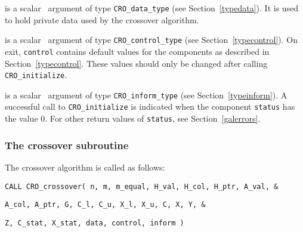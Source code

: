 \documentclass{galahad}
\newcommand{\packagename}{CRO}
\begin{document}
\vspace*{-3mm}
\begin{description}

 is a scalar \intentinout\ argument of type
{\tt \packagename\_data\_type}
(see Section~\ref{typedata}).
It is used to hold private data used by the crossover algorithm.

 is a scalar \intentout\ argument of type
{\tt \packagename\_control\_type}
(see Section~\ref{typecontrol}).
On exit, {\tt control} contains default values for the components as
described in Section~\ref{typecontrol}.
These values should only be changed after calling
{\tt \packagename\_initialize}.

 is a scalar \intentout\ argument of type
{\tt \packagename\_inform\_type}
(see Section~\ref{typeinform}). A successful call to
{\tt \packagename\_initialize}
is indicated when the  component {\tt status} has the value 0.
For other return values of {\tt status}, see Section~\ref{galerrors}.

\end{description}


\subsubsection{The crossover subroutine}\label{qps}
The crossover algorithm is called as follows:
\vspace*{1mm}

\hspace{8mm}
{\tt CALL \packagename\_crossover( n, m, m\_equal, H\_val, H\_col, H\_ptr, A\_val,     \&}
\vspace*{-1mm}

\hspace{43.5mm}
{\tt                               A\_col, A\_ptr, G, C\_l, C\_u, X\_l, X\_u, C, X, Y, \&}
\vspace*{-1mm}

\hspace{43.5mm}
{\tt                               Z, C\_stat, X\_stat, data, control, inform )}
\end{document}
